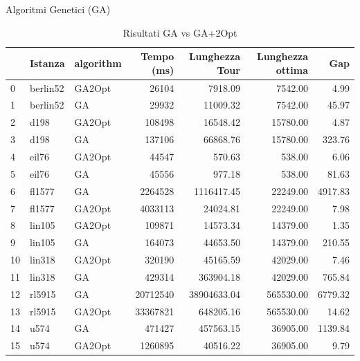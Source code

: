 \documentclass{beamer}
\begin{document}
\begin{frame}{Algoritmi Genetici (GA)}
\begin{table}[H]
        \caption{Risultati GA vs GA+2Opt}
        \begin{tabular}{lllrrrr}
            \toprule
               & Istanza  & algorithm & Tempo (ms) & Lunghezza Tour & Lunghezza ottima & Gap     \\
            \midrule
            0  & berlin52 & GA2Opt    & 26104      & 7918.09        & 7542.00          & 4.99    \\
            1  & berlin52 & GA        & 29932      & 11009.32       & 7542.00          & 45.97   \\
            2  & d198     & GA2Opt    & 108498     & 16548.42       & 15780.00         & 4.87    \\
            3  & d198     & GA        & 137106     & 66868.76       & 15780.00         & 323.76  \\
            4  & eil76    & GA2Opt    & 44547      & 570.63         & 538.00           & 6.06    \\
            5  & eil76    & GA        & 45556      & 977.18         & 538.00           & 81.63   \\
            6  & fl1577   & GA        & 2264528    & 1116417.45     & 22249.00         & 4917.83 \\
            7  & fl1577   & GA2Opt    & 4033113    & 24024.81       & 22249.00         & 7.98    \\
            8  & lin105   & GA2Opt    & 109871     & 14573.34       & 14379.00         & 1.35    \\
            9  & lin105   & GA        & 164073     & 44653.50       & 14379.00         & 210.55  \\
            10 & lin318   & GA2Opt    & 320190     & 45165.59       & 42029.00         & 7.46    \\
            11 & lin318   & GA        & 429314     & 363904.18      & 42029.00         & 765.84  \\
            12 & rl5915   & GA        & 20712540   & 38904633.04    & 565530.00        & 6779.32 \\
            13 & rl5915   & GA2Opt    & 33367821   & 648205.16      & 565530.00        & 14.62   \\
            14 & u574     & GA        & 471427     & 457563.15      & 36905.00         & 1139.84 \\
            15 & u574     & GA2Opt    & 1260895    & 40516.22       & 36905.00         & 9.79    \\
            \bottomrule
        \end{tabular}
    \end{table}
\end{frame}
\end{document}
